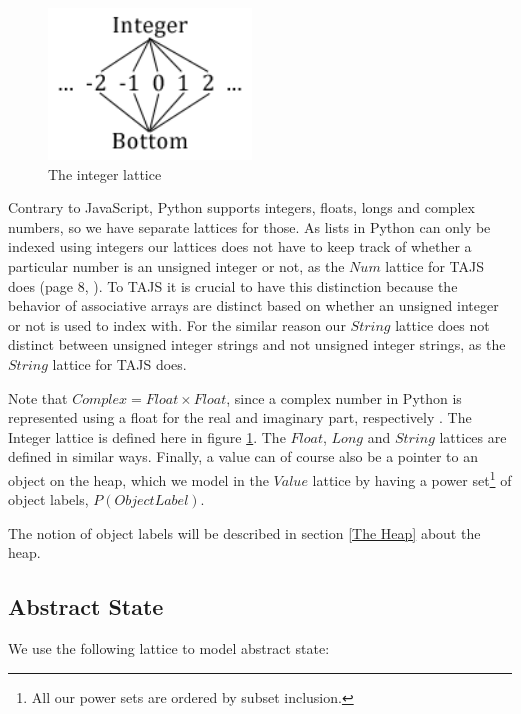 \begin{figure}
	\vspace{-20pt}
	\begin{center}
		\includegraphics[width=0.48\textwidth]{images/integer-lattice.png}
	\end{center}
	\vspace{-10pt}
	\caption{The integer lattice}
	\label{fig:latticeInteger}
	\vspace{-10pt}
\end{figure}

Contrary to JavaScript, Python supports integers, floats, longs and complex numbers, so we have separate lattices for those. As lists in Python can only be indexed using integers our lattices does not have to keep track of whether a particular number is an unsigned integer or not, as the $Num$ lattice for TAJS does (page 8, \cite{tajs}). To TAJS it is crucial to have this distinction because the behavior of associative arrays are distinct based on whether an unsigned integer or not is used to index with. For the similar reason our $String$ lattice does not distinct between unsigned integer strings and not unsigned integer strings, as the $String$ lattice for TAJS does.

Note that $Complex = Float \times Float$, since a complex number in Python is represented using a float for the real and imaginary part, respectively \cite{pyref.stdtypes}. The Integer lattice is defined here in figure \ref{fig:latticeInteger}. The $Float$, $Long$ and $String$ lattices are defined in similar ways. Finally, a value can of course also be a pointer to an object on the heap, which we model in the $Value$ lattice by having a power set\footnote{All our power sets are ordered by subset inclusion.} of object labels, $P(ObjectLabel)$.

The notion of object labels will be described in section \ref{The Heap} about the heap.

\subsection{Abstract State}
We use the following lattice to model abstract state:

